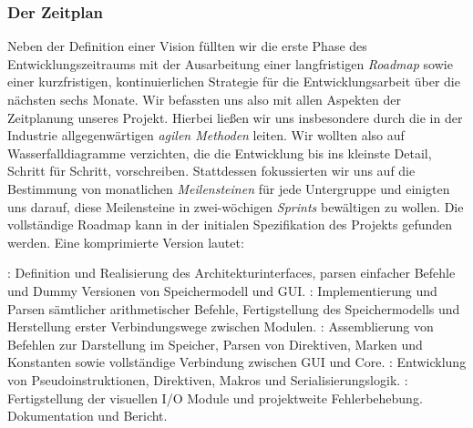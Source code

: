 
\subsubsection{Der Zeitplan}
\label{team:orga-plan-time}
\vspace{-0.2cm}

Neben der Definition einer Vision füllten wir die erste Phase des
Entwicklungszeitraums mit der Ausarbeitung einer langfristigen \emph{Roadmap}
sowie einer kurzfristigen, kontinuierlichen Strategie für die Entwicklungsarbeit
über die nächsten sechs Monate. Wir befassten uns also mit allen Aspekten der
Zeitplanung unseres Projekt. Hierbei ließen wir uns insbesondere durch die in
der Industrie allgegenwärtigen \emph{agilen Methoden} leiten. Wir wollten also
auf Wasserfalldiagramme verzichten, die die Entwicklung bis ins kleinste Detail,
Schritt für Schritt, vorschreiben. Stattdessen fokussierten wir uns auf die
Bestimmung von monatlichen \emph{Meilensteinen} für jede Untergruppe und
einigten uns darauf, diese Meilensteine in zwei-wöchigen \emph{Sprints}
bewältigen zu wollen. Die vollständige Roadmap kann in der initialen
Spezifikation des Projekts gefunden werden. Eine komprimierte Version lautet:
\begin{sitemize}{-0.35cm}
  : Definition und Realisierung des Architekturinterfaces, parsen einfacher Befehle und Dummy Versionen von Speichermodell und GUI.
  : Implementierung und Parsen sämtlicher arithmetischer Befehle, Fertigstellung des Speichermodells und Herstellung erster Verbindungswege zwischen Modulen.
  : Assemblierung von Befehlen zur Darstellung im Speicher, Parsen von Direktiven, Marken und Konstanten sowie vollständige Verbindung zwischen GUI und Core.
  : Entwicklung von Pseudoinstruktionen, Direktiven, Makros und Serialisierungslogik.
  : Fertigstellung der visuellen I/O Module und projektweite Fehlerbehebung.
   Dokumentation und Bericht.
  \vspace{-0.3cm}
\end{sitemize}
